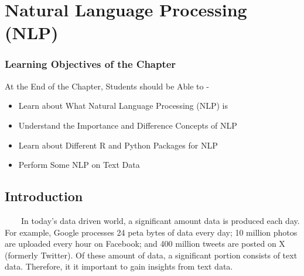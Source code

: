 \documentclass[
  letterpaper,
  DIV=11,
  numbers=noendperiod]{scrreprt}
\begin{document}
\chapter{Natural Language Processing
(NLP)}\label{natural-language-processing-nlp}

\subsection*{Learning Objectives of the
Chapter}\label{learning-objectives-of-the-chapter-9}

\begin{tcolorbox}[enhanced jigsaw, arc=.35mm, bottomrule=.15mm, bottomtitle=1mm, breakable, colback=white, colbacktitle=quarto-callout-note-color!10!white, colframe=quarto-callout-note-color-frame, coltitle=black, left=2mm, leftrule=.75mm, opacityback=0, opacitybacktitle=0.6, rightrule=.15mm, title=\textcolor{quarto-callout-note-color}{\faInfo}\hspace{0.5em}{Learning Objectives}, titlerule=0mm, toprule=.15mm, toptitle=1mm]

At the End of the Chapter, Students should be Able to -

\begin{itemize}
\item
  Learn about What Natural Language Processing (NLP) is
\item
  Understand the Importance and Difference Concepts of NLP
\item
  Learn about Different R and Python Packages for NLP
\item
  Perform Some NLP on Text Data
\end{itemize}

\end{tcolorbox}

\section{Introduction}\label{introduction-2}

~~~~In today's data driven world, a significant amount data is produced
each day. For example, Google processes 24 peta bytes of data every day;
10 million photos are uploaded every hour on Facebook; and 400 million
tweets are posted on X (formerly Twitter). Of these amount of data, a
significant portion consists of text data. Therefore, it it important to
gain insights from text data.
\end{document}
